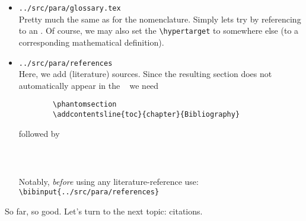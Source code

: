 \begin{itemize}
	\item \texttt{../src/para/glossary.tex} \\ 
	Pretty much the same as for the nomenclature. Simply lets try by referencing to an \RKHS. Of course, we may also set the \verb|\hypertarget| to somewhere else (\eg to a corresponding mathematical definition).
	
	\item \texttt{../src/para/references} \\ 
	Here, we add (literature) sources. Since the resulting section does not automatically appear in the \mytoc~ we need
	\begin{verbatim}
		\phantomsection
		\addcontentsline{toc}{chapter}{Bibliography}
	\end{verbatim}
	followed by
	\begin{verbatim}
		
		
	\end{verbatim}
	Notably, \emph{before} using any literature-reference use:\\
	\verb|\bibinput{../src/para/references}|
	
\end{itemize}

So far, so good. Let’s turn to the next topic: citations.